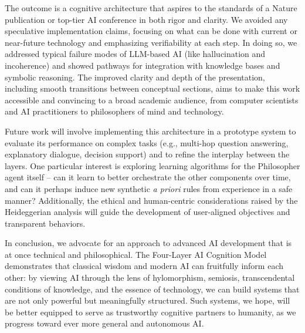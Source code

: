 \documentclass{article}
\begin{document}
The outcome is a cognitive architecture that aspires to the standards of a Nature publication or top-tier AI conference in both rigor and clarity. We avoided any speculative implementation claims, focusing on what can be done with current or near-future technology and emphasizing verifiability at each step. In doing so, we addressed typical failure modes of LLM-based AI (like hallucination and incoherence) and showed pathways for integration with knowledge bases and symbolic reasoning. The improved clarity and depth of the presentation, including smooth transitions between conceptual sections, aims to make this work accessible and convincing to a broad academic audience, from computer scientists and AI practitioners to philosophers of mind and technology.

Future work will involve implementing this architecture in a prototype system to evaluate its performance on complex tasks (e.g., multi-hop question answering, explanatory dialogue, decision support) and to refine the interplay between the layers. One particular interest is exploring learning algorithms for the Philosopher agent itself – can it learn to better orchestrate the other components over time, and can it perhaps induce new synthetic \emph{a priori} rules from experience in a safe manner? Additionally, the ethical and human-centric considerations raised by the Heideggerian analysis will guide the development of user-aligned objectives and transparent behaviors.

In conclusion, we advocate for an approach to advanced AI development that is at once technical and philosophical. The Four-Layer AI Cognition Model demonstrates that classical wisdom and modern AI can fruitfully inform each other: by viewing AI through the lens of hylomorphism, semiosis, transcendental conditions of knowledge, and the essence of technology, we can build systems that are not only powerful but meaningfully structured. Such systems, we hope, will be better equipped to serve as trustworthy cognitive partners to humanity, as we progress toward ever more general and autonomous AI. 
\end{document}
